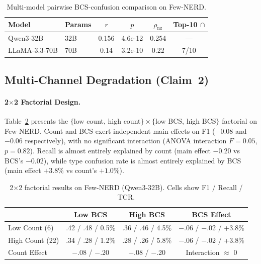 \documentclass[11pt,a4paper]{article}
\begin{document}
\begin{table}[t]
\centering
\small
\caption{Multi-model pairwise BCS-confusion comparison on Few-NERD.}
\label{tab:multimodel}
\begin{tabular}{llcccc}
\toprule
\textbf{Model} & \textbf{Params} & \textbf{$r$} & \textbf{$p$} & \textbf{$\rho_{\text{nz}}$} & \textbf{Top-10 $\cap$} \\
\midrule
Qwen3-32B      & 32B & 0.156 & 4.6e-12 & 0.254 & --- \\
LLaMA-3.3-70B  & 70B & 0.14  & 3.2e-10 & 0.22  & 7/10 \\
\bottomrule
\end{tabular}
\end{table}

\subsection{Multi-Channel Degradation (Claim~2)}
\label{sec:multichannel_results}

\paragraph{2$\times$2 Factorial Design.}
Table~\ref{tab:factorial} presents the $\{$low count, high count$\} \times \{$low BCS, high BCS$\}$ factorial on Few-NERD.
Count and BCS exert independent main effects on F1 ($-0.08$ and $-0.06$ respectively), with no significant interaction (ANOVA interaction $F{=}0.05$, $p{=}0.82$).
Recall is almost entirely explained by count (main effect $-0.20$ vs BCS's $-0.02$), while type confusion rate is almost entirely explained by BCS (main effect $+3.8\%$ vs count's $+1.0\%$).

\begin{table}[t]
\centering
\small
\caption{2$\times$2 factorial results on Few-NERD (Qwen3-32B). Cells show F1 / Recall / TCR.}
\label{tab:factorial}
\begin{tabular}{lccc}
\toprule
 & \textbf{Low BCS} & \textbf{High BCS} & \textbf{BCS Effect} \\
\midrule
Low Count (6)  & .42 / .48 / 0.5\% & .36 / .46 / 4.5\% & $-$.06 / $-$.02 / +3.8\% \\
High Count (22) & .34 / .28 / 1.2\% & .28 / .26 / 5.8\% & $-$.06 / $-$.02 / +3.8\% \\
\midrule
Count Effect   & $-$.08 / $-$.20  & $-$.08 / $-$.20  & Interaction $\approx$ 0 \\
\bottomrule
\end{tabular}
\end{table}
\end{document}
